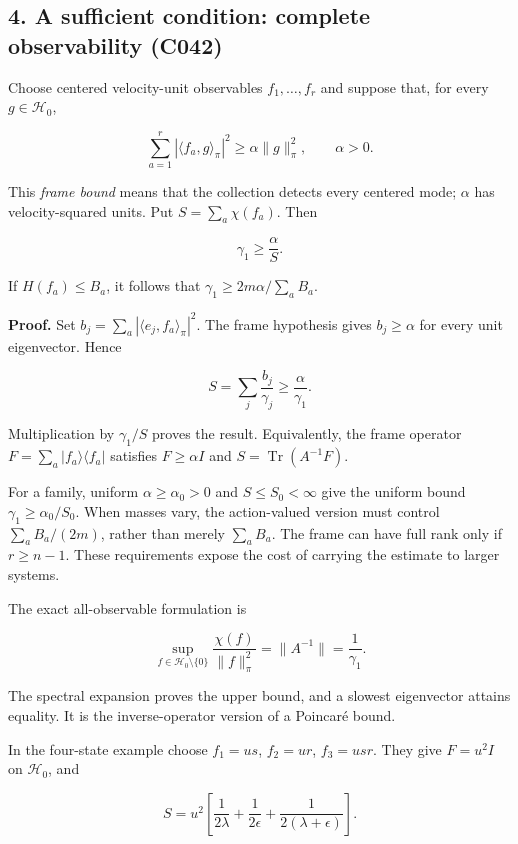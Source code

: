 \documentclass[11pt,a4paper]{article}
\begin{document}
\hypertarget{a-sufficient-condition-complete-observability-c042}{%
\subsection{4. A sufficient condition: complete observability
(C042)}\label{a-sufficient-condition-complete-observability-c042}}

Choose centered velocity-unit observables \(f_1,\ldots,f_r\) and suppose
that, for every \(g\in\mathcal H_0\),

\[
\sum_{a=1}^r|\langle f_a,g\rangle_\pi|^2
\ge\alpha\|g\|_\pi^2,\qquad\alpha>0.
\]

This \emph{frame bound} means that the collection detects every centered
mode; \(\alpha\) has velocity-squared units. Put \(S=\sum_a\chi(f_a)\).
Then

\[
\boxed{\gamma_1\ge\frac{\alpha}{S}.}
\]

If \(H(f_a)\le B_a\), it follows that \(\gamma_1\ge2m\alpha/\sum_aB_a\).

\textbf{Proof.} Set \(b_j=\sum_a|\langle e_j,f_a\rangle_\pi|^2\). The
frame hypothesis gives \(b_j\ge\alpha\) for every unit eigenvector.
Hence

\[
S=\sum_j\frac{b_j}{\gamma_j}\ge\frac{\alpha}{\gamma_1}.
\]

Multiplication by \(\gamma_1/S\) proves the result. Equivalently, the
frame operator \(F=\sum_a|f_a\rangle\langle f_a|\) satisfies
\(F\ge\alpha I\) and \(S=\operatorname{Tr}(A^{-1}F)\).

For a family, uniform \(\alpha\ge\alpha_0>0\) and \(S\le S_0<\infty\)
give the uniform bound \(\gamma_1\ge\alpha_0/S_0\). When masses vary,
the action-valued version must control \(\sum_aB_a/(2m)\), rather than
merely \(\sum_aB_a\). The frame can have full rank only if \(r\ge n-1\).
These requirements expose the cost of carrying the estimate to larger
systems.

The exact all-observable formulation is

\[
\sup_{f\in\mathcal H_0\setminus\{0\}}
\frac{\chi(f)}{\|f\|_\pi^2}=\|A^{-1}\|=\frac1{\gamma_1}.
\]

The spectral expansion proves the upper bound, and a slowest eigenvector
attains equality. It is the inverse-operator version of a Poincaré
bound.

In the four-state example choose \(f_1=us\), \(f_2=ur\), \(f_3=usr\).
They give \(F=u^2I\) on \(\mathcal H_0\), and

\[
S=u^2\left[\frac1{2\lambda}+\frac1{2\epsilon}
+\frac1{2(\lambda+\epsilon)}\right].
\]
\end{document}
